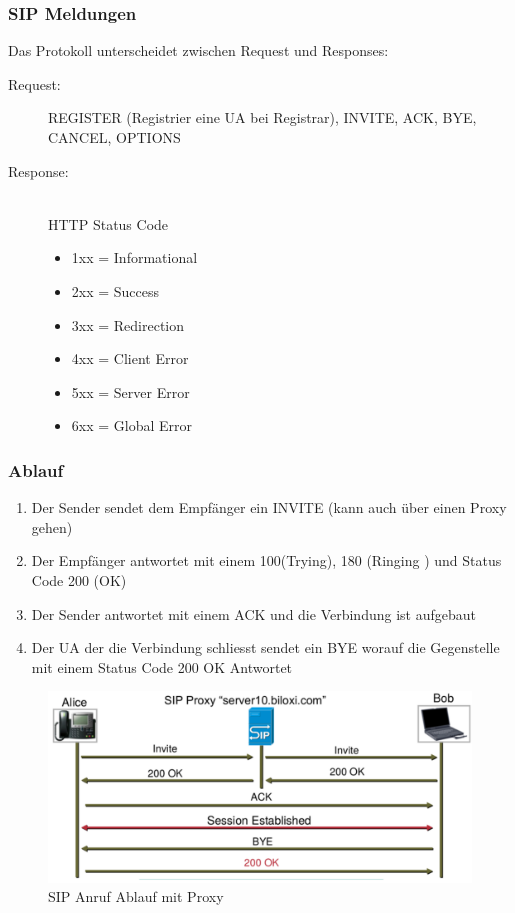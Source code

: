 \subsubsection{SIP Meldungen}
Das Protokoll unterscheidet zwischen Request und Responses:
\begin{description}
	\item[Request:] REGISTER (Registrier eine UA bei Registrar), INVITE, ACK, BYE, CANCEL, OPTIONS
	\item[Response:] \hfill \\
	HTTP Status Code
	\begin{itemize}
		\item 1xx = Informational
		\item 2xx = Success
		\item 3xx = Redirection
		\item 4xx = Client Error
		\item 5xx = Server Error
		\item 6xx = Global Error
	\end{itemize}
\end{description}

\subsubsection{Ablauf}
\begin{enumerate}
	\item Der Sender sendet dem Empfänger ein INVITE (kann auch über einen Proxy gehen)
	\item Der Empfänger antwortet mit einem 100(Trying), 180 (Ringing ) und Status Code 200 (OK)
	\item Der Sender antwortet mit einem ACK und die Verbindung ist aufgebaut
	\item Der UA der die Verbindung schliesst sendet ein BYE worauf die Gegenstelle mit einem Status Code 200 OK Antwortet
\end{enumerate}

\begin{figure}[h]
\centering
\includegraphics[width=0.7\linewidth]{images/sip_messages}
\caption{SIP Anruf Ablauf mit Proxy}
\end{figure}



